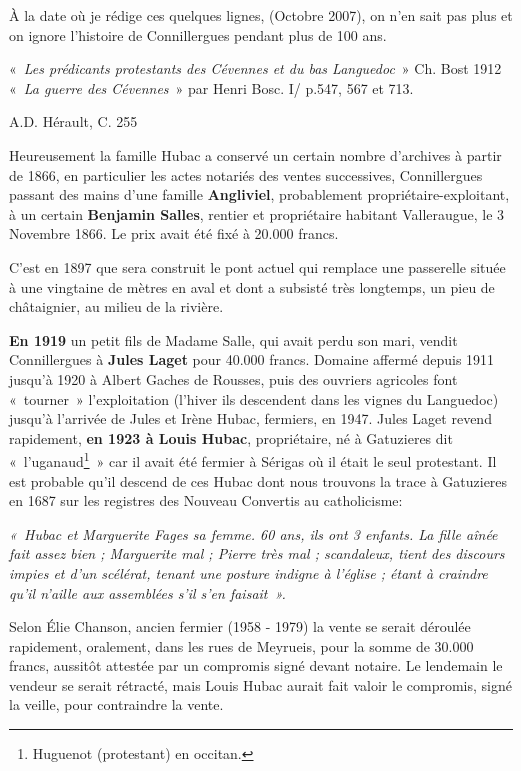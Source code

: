 À la date où je rédige ces quelques lignes, (Octobre 2007), on n’en sait pas plus et on ignore
l’histoire de Connillergues pendant plus de 100 ans.

\begin{flushright}
    «~\textit{Les prédicants protestants des Cévennes et du bas Languedoc}~» Ch. Bost 1912
    «~\textit{La guerre des Cévennes}~» par Henri Bosc. I/ p.547, 567 et 713.

    \item A.D. Hérault, C. 255
\end{flushright}


Heureusement la famille Hubac a conservé un certain nombre d’archives à partir de 1866, en
particulier les actes notariés des ventes successives, Connillergues passant des mains d’une
famille \textbf{Angliviel}, probablement propriétaire-exploitant, à un certain \textbf{Benjamin Salles}, rentier
et propriétaire habitant Valleraugue, le 3 Novembre 1866. Le prix avait été fixé à 20.000
francs.

C’est en 1897 que sera construit le pont actuel qui remplace une passerelle située à une
vingtaine de mètres en aval et dont a subsisté très longtemps, un pieu de châtaignier, au milieu
de la rivière.

\textbf{En 1919} un petit fils de Madame Salle, qui avait perdu son mari, vendit Connillergues à \textbf{Jules
Laget} pour 40.000 francs. Domaine affermé depuis 1911 jusqu’à 1920 à Albert Gaches de
Rousses, puis des ouvriers agricoles font «~tourner~» l’exploitation (l’hiver ils descendent
dans les vignes du Languedoc) jusqu’à l’arrivée de Jules et Irène Hubac, fermiers, en 1947.
Jules Laget revend rapidement, \textbf{en 1923 à Louis Hubac}, propriétaire, né à Gatuzieres dit «~l'uganaud\footnote{Huguenot (protestant) en occitan.}~» car il avait été fermier à Sérigas où il était le seul protestant. Il est probable qu’il descend de ces Hubac dont nous trouvons la trace à Gatuzieres en 1687 sur les registres des Nouveau Convertis au catholicisme:

\textit{«~Hubac et Marguerite Fages sa femme. 60 ans, ils ont 3 enfants. La fille aînée fait assez bien ;
Marguerite mal ; Pierre très mal ; scandaleux, tient des discours impies et d’un scélérat,
tenant une posture indigne à l’église ; étant à craindre qu’il n’aille aux assemblées s’il s’en
faisait~».}

Selon Élie Chanson, ancien fermier (1958 - 1979) la vente se serait déroulée rapidement,
oralement, dans les rues de Meyrueis, pour la somme de 30.000 francs, aussitôt attestée par un
compromis signé devant notaire. Le lendemain le vendeur se serait rétracté, mais Louis Hubac
aurait fait valoir le compromis, signé la veille, pour contraindre la vente.

